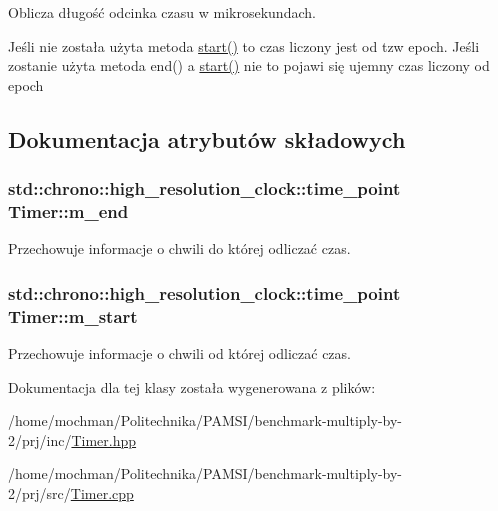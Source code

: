 Oblicza długość odcinka czasu w mikrosekundach. 

Jeśli nie została użyta metoda \hyperlink{class_timer_a3a8b5272198d029779dc9302a54305a8}{start()} to czas liczony jest od tzw epoch. Jeśli zostanie użyta metoda end() a \hyperlink{class_timer_a3a8b5272198d029779dc9302a54305a8}{start()} nie to pojawi się ujemny czas liczony od epoch 

\subsection{Dokumentacja atrybutów składowych}
\hypertarget{class_timer_a9aef0f9d32d37b36b843e60eb10d0644}{
\subsubsection[{m\-\_\-end}]{\setlength{\rightskip}{0pt plus 5cm}std\-::chrono\-::high\-\_\-resolution\-\_\-clock\-::time\-\_\-point Timer\-::m\-\_\-end\hspace{0.3cm}{\ttfamily [private]}}}\label{class_timer_a9aef0f9d32d37b36b843e60eb10d0644}


Przechowuje informacje o chwili do której odliczać czas. 

\hypertarget{class_timer_ac14f6ea6f71c3eef3c88780e009741c8}{
\subsubsection[{m\-\_\-start}]{\setlength{\rightskip}{0pt plus 5cm}std\-::chrono\-::high\-\_\-resolution\-\_\-clock\-::time\-\_\-point Timer\-::m\-\_\-start\hspace{0.3cm}{\ttfamily [private]}}}\label{class_timer_ac14f6ea6f71c3eef3c88780e009741c8}


Przechowuje informacje o chwili od której odliczać czas. 



Dokumentacja dla tej klasy została wygenerowana z plików\-:\begin{DoxyCompactItemize}
\item 
/home/mochman/\-Politechnika/\-P\-A\-M\-S\-I/benchmark-\/multiply-\/by-\/2/prj/inc/\hyperlink{_timer_8hpp}{Timer.\-hpp}\item 
/home/mochman/\-Politechnika/\-P\-A\-M\-S\-I/benchmark-\/multiply-\/by-\/2/prj/src/\hyperlink{_timer_8cpp}{Timer.\-cpp}\end{DoxyCompactItemize}
